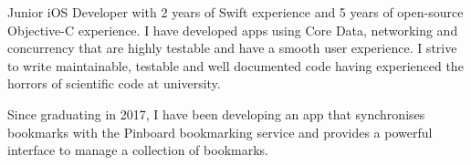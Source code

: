 %
Junior iOS Developer with 2 years of Swift experience and 5 years of open-source
Objective-C experience. I have developed apps using Core Data, networking and
concurrency that are highly testable and have a smooth user experience. I strive
to write maintainable, testable and well documented code having experienced the
horrors of scientific code at university.

\smallskip

Since graduating in 2017, I have been developing an app that synchronises
bookmarks with the Pinboard bookmarking service and provides a powerful
interface to manage a collection of bookmarks.

\bigskip

